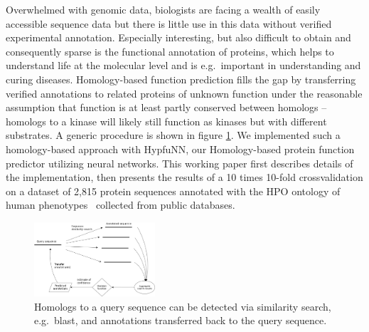 Overwhelmed with genomic data, biologists are facing a wealth of easily accessible sequence data but there is little use in this data without verified experimental annotation. Especially interesting, but also difficult to obtain and consequently sparse is the functional annotation of proteins, which helps to understand life at the molecular level and is e.g.~important in understanding and curing diseases. Homology-based function prediction fills the gap by transferring verified annotations to related proteins of unknown function under the reasonable assumption that function is at least partly conserved between homologs -- homologs to a kinase will likely still function as kinases but  with different substrates. A generic procedure is shown in figure \ref{fig:function_transfer}. We implemented such a homology-based approach with HypfuNN, our Homology-based protein function predictor utilizing neural networks. This working paper first describes details of the implementation, then presents the results of a 10 times 10-fold crossvalidation on a dataset of 2,815 protein sequences annotated with the HPO ontology of human phenotypes~\citep{Koehler2014} collected from public databases.

\begin{figure}[!hb]
\includegraphics[width = 0.4\textwidth]{figures/function_transfer.png}
\caption{Homologs to a query sequence can be detected via similarity search, e.g.~blast, and annotations transferred back to the query sequence.}
\label{fig:function_transfer}
\end{figure}

